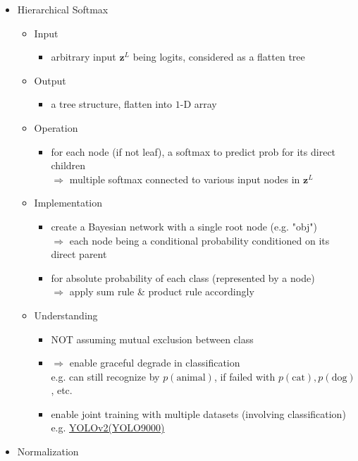 \begin{itemize}
\item Hierarchical Softmax \label{DL_Layers_Hisoftmax}
	\begin{itemize}
	\item Input
		\begin{itemize}
		\item arbitrary input $\mathbf z^{L}$ being logits, considered as a flatten tree
		\end{itemize}
	\item Output
		\begin{itemize}
		\item a tree structure, flatten into $1$-D array
		\end{itemize}
	\item Operation
		\begin{itemize}
		\item for each node (if not leaf), a softmax to predict prob for its direct children \\
		$\Rightarrow$ multiple softmax connected to various input nodes in $\mathbf z^L$
		\end{itemize}
	\item Implementation
		\begin{itemize}
		\item create a Bayesian network with a single root node (e.g. "obj") \\
		$\Rightarrow$ each node being a conditional probability conditioned on its direct parent
		\item for absolute probability of each class (represented by a node) \\ 
		$\Rightarrow$ apply sum rule \& product rule accordingly
		\end{itemize}
	\item Understanding
		\begin{itemize}
		\item NOT assuming mutual exclusion between class
		\item $\Rightarrow$ enable graceful degrade in classification \\
		e.g. can still recognize by $p(\text{animal})$, if failed with $p(\text{cat}), p(\text{dog})$, etc.
		\item enable joint training with multiple datasets (involving classification) \\
		e.g. \hyperref[DL_CV_Objdet_YOLOv2]{YOLOv2(YOLO9000)}
		\end{itemize}
	\end{itemize}

\item Normalization
\end{itemize}

